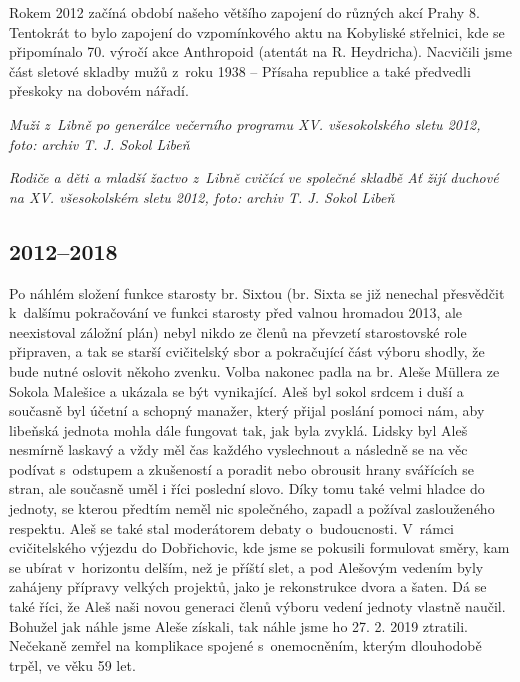 \documentclass[a5paper, 12pt, twoside]{article}
\begin{document}
Rokem 2012 začíná období našeho většího zapojení do různých akcí Prahy
8. Tentokrát to bylo zapojení do vzpomínkového aktu na Kobyliské
střelnici, kde se připomínalo 70. výročí akce Anthropoid (atentát na R.
Heydricha). Nacvičili jsme část sletové skladby mužů z~roku 1938 --
Přísaha republice a také předvedli přeskoky na dobovém nářadí.


\textit{Muži z~Libně po generálce večerního programu XV. všesokolského
sletu 2012, foto: archiv T. J. Sokol Libeň}


\textit{Rodiče a děti a mladší žactvo z~Libně cvičící ve společné skladbě
Ať žijí duchové na XV. všesokolském sletu 2012, foto: archiv T. J. Sokol Libeň}

\subsection{2012--2018}

Po náhlém složení funkce starosty br. Sixtou (br. Sixta se již nenechal
přesvědčit k~dalšímu pokračování ve funkci starosty před valnou hromadou
2013, ale neexistoval záložní plán) nebyl nikdo ze členů na převzetí
starostovské role připraven, a tak se starší cvičitelský sbor a
pokračující část výboru shodly, že bude nutné oslovit někoho zvenku.
Volba nakonec padla na br. Aleše Müllera ze Sokola Malešice a ukázala se
být vynikající. Aleš byl sokol srdcem i duší a současně byl účetní a
schopný manažer, který přijal poslání pomoci nám, aby libeňská jednota
mohla dále fungovat tak, jak byla zvyklá. Lidsky byl Aleš nesmírně
laskavý a vždy měl čas každého vyslechnout a následně se na věc podívat
s~odstupem a zkušeností a poradit nebo obrousit hrany svářících se
stran, ale současně uměl i říci poslední slovo. Díky tomu také velmi
hladce do jednoty, se kterou předtím neměl nic společného, zapadl a
požíval zaslouženého respektu. Aleš se také stal moderátorem debaty
o~budoucnosti. V~rámci cvičitelského výjezdu do Dobřichovic, kde jsme se
pokusili formulovat směry, kam se ubírat v~horizontu delším, než je
příští slet, a pod Alešovým vedením byly zahájeny přípravy velkých
projektů, jako je rekonstrukce dvora a šaten. Dá se také říci, že Aleš
naši novou generaci členů výboru vedení jednoty vlastně naučil. Bohužel
jak náhle jsme Aleše získali, tak náhle jsme ho 27. 2. 2019 ztratili.
Nečekaně zemřel na komplikace spojené s~onemocněním, kterým dlouhodobě
trpěl, ve věku 59 let.
\end{document}
